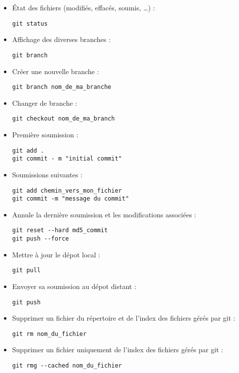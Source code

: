 \documentclass[fleqn,11pt]{article}
\begin{document}
\begin{itemize}
\item \'Etat des fichiers (modifiés, effacés, soumis, \ldots ) : 
\begin{lstlisting}
git status
\end{lstlisting}
\item Affichage des diverses branches : 
\begin{lstlisting}
git branch
\end{lstlisting}
\item Créer une nouvelle branche :
\begin{lstlisting}
git branch nom_de_ma_branche
\end{lstlisting}
\item Changer de branche :
\begin{lstlisting}
git checkout nom_de_ma_branch
\end{lstlisting}
\item Première soumission :
\begin{lstlisting}
git add .
git commit - m "initial commit"
\end{lstlisting}
\item Soumissions suivantes :
\begin{lstlisting}
git add chemin_vers_mon_fichier
git commit -m "message du commit"
\end{lstlisting}
\item Annule la dernière soumission et les modifications associées :
\begin{lstlisting}
git reset --hard md5_commit
git push --force
\end{lstlisting}
\item Mettre à jour le dépot local :
\begin{lstlisting}
git pull
\end{lstlisting}
\item Envoyer sa soumission au dépot distant :
\begin{lstlisting}
git push
\end{lstlisting}
\item Supprimer un fichier du répertoire et de l'index des fichiers
gérés par git :
\begin{lstlisting}
git rm nom_du_fichier
\end{lstlisting}
\item Supprimer un fichier uniquement de l'index des fichiers gérés par git :
\begin{lstlisting}
git rmg --cached nom_du_fichier
\end{lstlisting}
\end{itemize}
\end{document}
